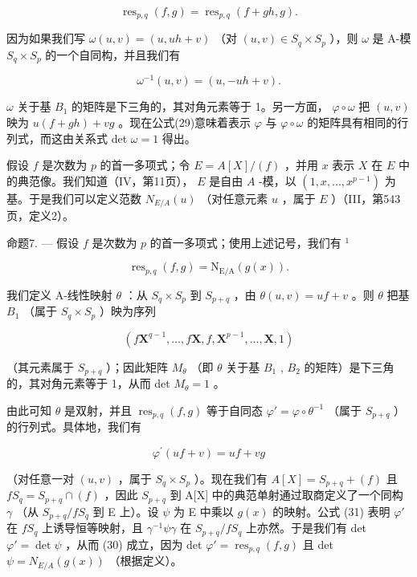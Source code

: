 \[
\operatorname{res} _ {p, q} (f, g) = \operatorname{res} _ {p, q} (f + g h, g).\tag{29}
\]

因为如果我们写 \(\omega(u, v) = (u, uh + v)\) （对 \((u, v) \in S_q \times S_p\) ），则 \(\omega\) 是 A-模 \(S_q \times S_p\) 的一个自同构，并且我们有

\[
\omega^ {- 1} (u, v) = (u, - u h + v).
\]

\(\omega\) 关于基 \(B_{1}\) 的矩阵是下三角的，其对角元素等于 1。另一方面， \(\varphi \circ \omega\) 把 \((u, v)\) 映为 \(u(f + gh) + vg\) 。现在公式(29)意味着表示 \(\varphi\) 与 \(\varphi \circ \omega\) 的矩阵具有相同的行列式，而这由关系式 det \(\omega = 1\) 得出。

假设 \(f\) 是次数为 \(p\) 的首一多项式；令 \(E = A[X]/(f)\) ，并用 \(x\) 表示 \(X\) 在 \(E\) 中的典范像。我们知道（IV，第11页）， \(E\) 是自由 \(A\) -模，以 \((1, x, ..., x^{p-1})\) 为基。于是我们可以定义范数 \(N_{E/A}(u)\) （对任意元素 \(u\) ，属于 \(E\) ）（III，第543页，定义2）。

命题7. --- 假设 \(f\) 是次数为 \(p\) 的首一多项式；使用上述记号，我们有 \(^{1}\)

\[
\operatorname{res} _ {p, q} (f, g) = \mathrm{N} _ {\mathrm{E/A}} (g (x)).\tag{30}
\]

我们定义 A-线性映射 \(\theta\) ：从 \(S_q \times S_p\) 到 \(S_{p+q}\) ，由 \(\theta(u, v) = uf + v\) 。则 \(\theta\) 把基 \(B_1\) （属于 \(S_q \times S_p\) ）映为序列

\[
(f \mathbf {X} ^ {q - 1}, \dots , f \mathbf {X}, f, \mathbf {X} ^ {p - 1}, \dots , \mathbf {X}, 1)
\]

（其元素属于 \(S_{p+q}\) ）；因此矩阵 \(M_{\theta}\) （即 \(\theta\) 关于基 \(B_{1}\) , \(B_{2}\) 的矩阵）是下三角的，其对角元素等于 1，从而 det \(M_{\theta}=1\) 。

由此可知 \(\theta\) 是双射，并且 \(\operatorname{res}_{p,q}(f,g)\) 等于自同态 \(\varphi' = \varphi \circ \theta^{-1}\) （属于 \(S_{p + q}\) ）的行列式。具体地，我们有

\[
\varphi^ {\prime} (u f + v) = u f + v g\tag{31}
\]

（对任意一对 \((u,v)\) ，属于 \(S_{q}\times S_{p}\) ）。现在我们有 \(A[X]=S_{p+q}+(f)\) 且 \(fS_{q}=S_{p+q}\cap(f)\) ，因此 \(S_{p+q}\) 到 A{[}X{]} 中的典范单射通过取商定义了一个同构 \(\gamma\) （从 \(S_{p+q}/fS_{q}\) 到 E 上）。设 \(\psi\) 为 E 中乘以 \(g(x)\) 的映射。公式 (31) 表明 \(\varphi'\) 在 \(fS_{q}\) 上诱导恒等映射，且 \(\gamma^{-1}\psi\gamma\) 在 \(S_{p+q}/fS_{q}\) 上亦然。于是我们有 det \(\varphi'=\det\psi\) ，从而 (30) 成立，因为 det \(\varphi'=\operatorname{res}_{p,q}(f,g)\) 且 det \(\psi=N_{E/A}(g(x))\) （根据定义）。

